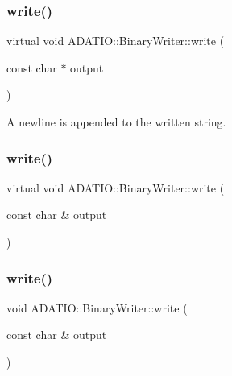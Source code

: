 \subsubsection{\texorpdfstring{write()}{write()}\hspace{0.1cm}{\footnotesize\ttfamily [4/24]}}
{\footnotesize\ttfamily virtual void A\+D\+A\+T\+I\+O\+::\+Binary\+Writer\+::write (\begin{DoxyParamCaption}\item[{const char $\ast$}]{output }\end{DoxyParamCaption})\hspace{0.3cm}{\ttfamily [virtual]}}

A newline is appended to the written string. \mbox{\label{classADATIO_1_1BinaryWriter_a910cfae9646644ba79a79b5686099fa9}} 
\subsubsection{\texorpdfstring{write()}{write()}\hspace{0.1cm}{\footnotesize\ttfamily [5/24]}}
{\footnotesize\ttfamily virtual void A\+D\+A\+T\+I\+O\+::\+Binary\+Writer\+::write (\begin{DoxyParamCaption}\item[{const char \&}]{output }\end{DoxyParamCaption})\hspace{0.3cm}{\ttfamily [virtual]}}

\mbox{\label{classADATIO_1_1BinaryWriter_aff26660b47d90f1ccfcd8ae06888d95b}} 
\subsubsection{\texorpdfstring{write()}{write()}\hspace{0.1cm}{\footnotesize\ttfamily [6/24]}}
{\footnotesize\ttfamily void A\+D\+A\+T\+I\+O\+::\+Binary\+Writer\+::write (\begin{DoxyParamCaption}\item[{const char \&}]{output }\end{DoxyParamCaption})\hspace{0.3cm}{\ttfamily [virtual]}}

